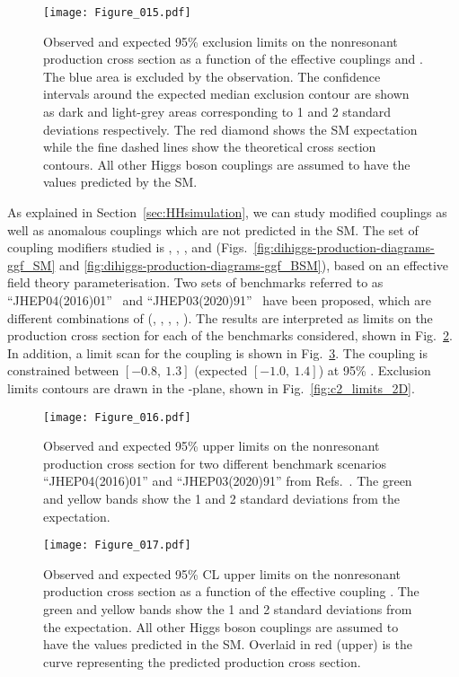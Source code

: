 \begin{figure}[htb!]
  \centering
  \texttt{[image: Figure\_015.pdf]}
  \caption{Observed and expected 95\% \CL exclusion limits on the nonresonant \HH production cross section as a function of the effective couplings \klambda and \ktop. The blue area is excluded by the observation. The confidence intervals around the expected median exclusion contour are shown as dark and light-grey areas corresponding to 1 and 2 standard deviations respectively. The red diamond shows the SM expectation while the fine dashed lines show the theoretical cross section contours. All other Higgs boson couplings are assumed to have the values predicted by the SM.}
  \label{fig:2D_exclusion_kt_kl}
\end{figure}

As explained in Section~\ref{sec:HHsimulation}, we can study modified \HH couplings as well as anomalous couplings which are not predicted in the SM. The set of coupling modifiers studied is \klambda, \ktop, \ctwo, \cg and \cgg (Figs.~\ref{fig:dihiggs-production-diagrams-ggf_SM} and \ref{fig:dihiggs-production-diagrams-ggf_BSM}), based on an effective field theory parameterisation. Two sets of benchmarks referred to as ``JHEP04(2016)01''~\cite{Carvalho_2016} and ``JHEP03(2020)91''~\cite{Capozi_2020} have been proposed,
which are different combinations of (\klambda, \ktop, \ctwo, \cg, \cgg). The results are interpreted as limits on the \GGF production cross section for each of the benchmarks considered, shown in Fig.~\ref{fig:benchmarks_all}. In addition, a limit scan for the \ctwo coupling is shown in Fig.~\ref{fig:c2_limits_1D}. The \ctwo coupling is constrained between $[-0.8,\ 1.3]$ (expected $[-1.0, \ 1.4]$) at 95\% \CL. Exclusion limits contours are drawn in the \klambda-\ctwo plane, shown in Fig.~\ref{fig:c2_limits_2D}.



\begin{figure}[htb!]
  \centering
  \texttt{[image: Figure\_016.pdf]}
  \caption{Observed and expected 95\% \CL upper limits on the nonresonant \HH production cross section for two different benchmark scenarios ``JHEP04(2016)01'' and ``JHEP03(2020)91'' from Refs.~\cite{Carvalho_2016,Capozi_2020}. The green and yellow bands show the 1 and 2 standard deviations from the expectation.}
  \label{fig:benchmarks_all}
\end{figure}


\begin{figure}[htb!]
  \centering
  \texttt{[image: Figure\_017.pdf]}
  \caption{Observed and expected 95\% CL upper limits on the nonresonant \HH production cross section as a function of the effective coupling \ctwo. The green and yellow bands show the 1 and 2 standard deviations from the expectation. All other Higgs boson couplings are assumed to have the values predicted in the SM. Overlaid in red (upper) is the curve representing the predicted \HH production cross section.}
  \label{fig:c2_limits_1D}
\end{figure}



